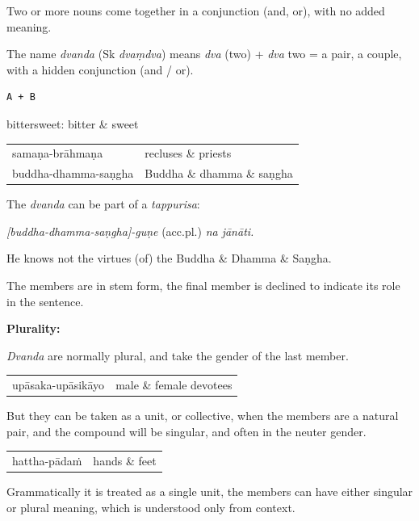 \documentclass[11pt,oneside]{memoir}
\begin{document}
Two or more nouns come together in a conjunction (and, or), with no added meaning.

The name \emph{dvanda} (Sk \emph{dvaṃdva}) means \emph{dva} (two) + \emph{dva} two = a pair, a
couple, with a hidden conjunction (and / or).

\begin{verbatim}
A + B
\end{verbatim}


bittersweet: bitter \& sweet

\begin{center}
\begin{tabular}{ll}
samaṇa-brāhmaṇa & recluses \& priests\\
buddha-dhamma-saṇgha & Buddha \& dhamma \& saṇgha\\
\end{tabular}
\end{center}

The \emph{dvanda} can be part of a \emph{tappurisa}:

\emph{{[}buddha-dhamma-saṇgha]-guṇe} (acc.pl.) \emph{na jānāti.}

He knows not the virtues (of) the Buddha \& Dhamma \& Saṇgha.

The members are in stem form, the final member is declined to indicate its role in the sentence.

\textbf{Plurality:}

\emph{Dvanda} are normally plural, and take the gender of the last member.

\begin{center}
\begin{tabular}{ll}
upāsaka-upāsikāyo & male \& female devotees\\
\end{tabular}
\end{center}

But they can be taken as a unit, or collective, when the members are a natural
pair, and the compound will be singular, and often in the neuter gender.

\begin{center}
\begin{tabular}{ll}
hattha-pādaṁ & hands \& feet\\
\end{tabular}
\end{center}

Grammatically it is treated as a single unit, the members can have either
singular or plural meaning, which is understood only from context.
\end{document}
